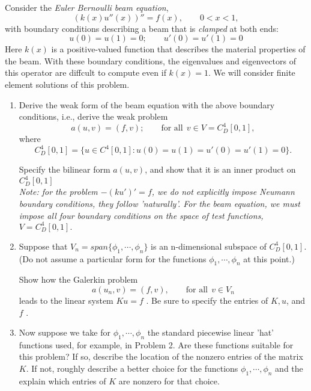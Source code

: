 Consider the \textit{Euler Bernoulli beam equation},
\[
(k(x)u''(x))'' = f(x), \qquad 0 < x < 1,
\]
with boundary conditions describing a beam that is \textit{clamped} at both ends:
\[u(0) = u(1) = 0; \qquad  u'(0) = u'(1) = 0
\]
Here $k(x)$ is a positive-valued function that describes the material properties of the beam.
With these boundary conditions, the eigenvalues and eigenvectors of this operator are diffcult to
compute even if $k(x)=1$. We will consider finite element solutions of this problem.

\begin{enumerate}
\item Derive the weak form of the beam equation with the above boundary conditions, i.e., derive the
weak problem
\[
a(u,v) = (f, v); \qquad \mbox{for all} \:\:v \in V = C_D^4[0, 1],
\]
where
\[
C_D^4[0, 1] = \{u \in C^4[0, 1] : u(0) = u(1) = u'(0) = u'(1) = 0\}.
\]

Specify the bilinear form $a(u, v)$, and show that it is an inner product on $C_D^4[0, 1]$
\\
\emph{Note: for the problem $-(k u')' = f$, we do not explicitly impose Neumann boundary conditions, they follow 'naturally'. For the beam equation, we must impose all four boundary conditions on the space of test functions, $V =C_D^4[0, 1].$}

\item Suppose that $V_n = span\{\phi_1, \cdots, \phi_n\}$ is an n-dimensional subspace of $C_D^4[0, 1].$
(Do not assume a particular form for the functions $\phi_1, \cdots, \phi_n$ at this point.)

Show how the Galerkin problem
\[
a(u_n, v) = (f, v), \qquad \mbox{for all}\:\: v \in V_n
\]
leads to the linear system $Ku = f$ . Be sure to specify the entries of $K, u$, and $f$ .

\item Now suppose we take for $\phi_1, \cdots, \phi_n$  the standard piecewise linear 'hat' functions used, for example, in Problem 2. Are these functions suitable for this problem? If so, describe the location of the
nonzero entries of the matrix $K$. If not, roughly describe a better choice for the functions $\phi_1, \cdots, \phi_n$ 
and the explain which entries of $K$ are nonzero for that choice.
\end{enumerate}


